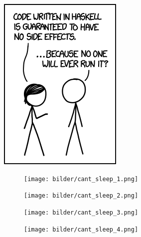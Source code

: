 \begin{figure}[t]
\centering
\includegraphics[width=.7\linewidth]{bilder/haskell.png}
\end{figure}

\begin{figure}[b]
    
    \begin{subfigure}{.23\textwidth}
	    \texttt{[image: bilder/cant\_sleep\_1.png]}
    \end{subfigure}
    \hfill
    \begin{subfigure}{.23\textwidth}
	    \texttt{[image: bilder/cant\_sleep\_2.png]}
    \end{subfigure}
    \hfill
    \begin{subfigure}{.23\textwidth}
	    \texttt{[image: bilder/cant\_sleep\_3.png]}
    \end{subfigure}
    \hfill
    \begin{subfigure}{.23\textwidth}
	    \texttt{[image: bilder/cant\_sleep\_4.png]}
    \end{subfigure}

\end{figure}

